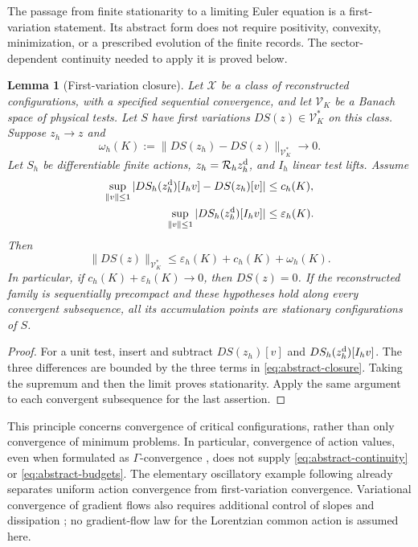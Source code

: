 \documentclass[11pt]{article}
\numberwithin{equation}{section}
\newtheorem{lemma}[lemma]{Lemma}
\theoremstyle{definition}
\theoremstyle{remark}
\newcommand{\norm}[1]{\lVert#1\rVert}
\begin{document}
The passage from finite stationarity to a limiting Euler equation is a
first-variation statement.  Its abstract form does not require positivity,
convexity, minimization, or a prescribed evolution of the finite records.
The sector-dependent continuity needed to apply it is proved below.

\begin{lemma}[First-variation closure]
\label{thm:abstract-closure}
Let $\mathscr X$ be a class of reconstructed configurations, with a specified
sequential convergence, and let $\mathscr V_K$ be a Banach space of physical
tests.  Let $S$ have first variations $DS(z)\in\mathscr V_K^*$ on this class.
Suppose $z_h\to z$ and
\begin{equation}
 \omega_h(K):=\norm{DS(z_h)-DS(z)}_{\mathscr V_K^*}\longrightarrow0.
 \label{eq:abstract-continuity}
\end{equation}
Let $S_h$ be differentiable finite actions, $z_h=\mathcal R_hz_h^{\rm d}$,
and $I_h$ linear test lifts.  Assume
\begin{align}
 \sup_{\norm v\le1}|DS_h(z_h^{\rm d})[I_hv]-DS(z_h)[v]|&\le c_h(K),\notag\\
 \sup_{\norm v\le1}|DS_h(z_h^{\rm d})[I_hv]|&\le\varepsilon_h(K).
 \label{eq:abstract-budgets}
\end{align}
Then
\begin{equation}
 \norm{DS(z)}_{\mathscr V_K^*}
 \le\varepsilon_h(K)+c_h(K)+\omega_h(K).
 \label{eq:abstract-closure}
\end{equation}
In particular, if $c_h(K)+\varepsilon_h(K)\to0$, then $DS(z)=0$.
If the reconstructed family is sequentially precompact and these hypotheses
hold along every convergent subsequence, all its accumulation points are
stationary configurations of $S$.
\end{lemma}
\begin{proof}
For a unit test, insert and subtract $DS(z_h)[v]$ and
$DS_h(z_h^{\rm d})[I_hv]$.  The three differences are bounded by the three
terms in \eqref{eq:abstract-closure}.  Taking the supremum and then the limit
proves stationarity.  Apply the same argument to each convergent subsequence
for the last assertion.
\end{proof}

This principle concerns convergence of critical configurations, rather than
only convergence of minimum problems.  In particular, convergence of action
values, even when formulated as $\Gamma$-convergence
\cite{DalMaso1993,Braides2002}, does not supply
\eqref{eq:abstract-continuity} or \eqref{eq:abstract-budgets}.
The elementary oscillatory example following  already
separates uniform action convergence from first-variation convergence.
Variational convergence of gradient flows also requires additional control
of slopes and dissipation \cite{SandierSerfaty2004}; no gradient-flow law for
the Lorentzian common action is assumed here.
\end{document}
